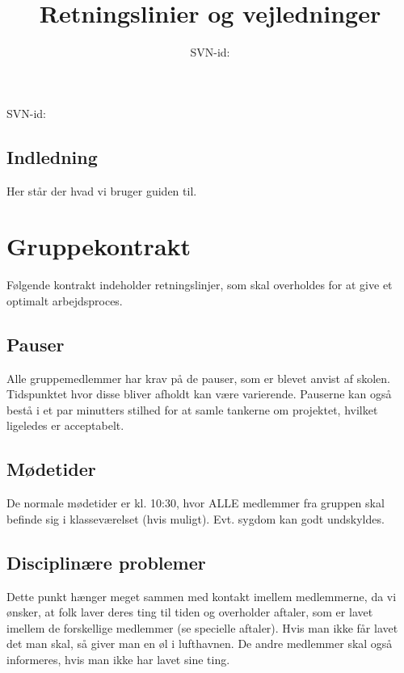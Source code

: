 \documentclass[simple,final]{../mypaper}
\title{Retningslinier og vejledninger}
\date{SVN-id: \SVNId}
\begin{document}
{
\Huge \flushright \bfseries \thetitle
}
{
\flushright SVN-id: \SVNId
}


\tableofcontents*


\section{Indledning}

Her står der hvad vi bruger guiden til.



\chapter{Gruppekontrakt}

Følgende kontrakt indeholder retningslinjer, som skal overholdes for
at give et optimalt arbejdsproces.


\section{Pauser}

Alle gruppemedlemmer har krav på de pauser, som er blevet anvist af
skolen. Tidspunktet hvor disse bliver afholdt kan være
varierende. Pauserne kan også bestå i et par minutters stilhed for at
samle tankerne om projektet, hvilket ligeledes er acceptabelt.


\section{Mødetider}

De normale mødetider er kl. 10:30, hvor ALLE medlemmer fra gruppen
skal befinde sig i klasseværelset (hvis muligt). Evt. sygdom kan godt
undskyldes.


\section{Disciplinære problemer}

Dette punkt hænger meget sammen med kontakt imellem medlemmerne, da vi
ønsker, at folk laver deres ting til tiden og overholder aftaler, som
er lavet imellem de forskellige medlemmer (se specielle aftaler). Hvis
man ikke får lavet det man skal, så giver man en øl i lufthavnen. De
andre medlemmer skal også informeres, hvis man ikke har lavet sine
ting.
\end{document}

